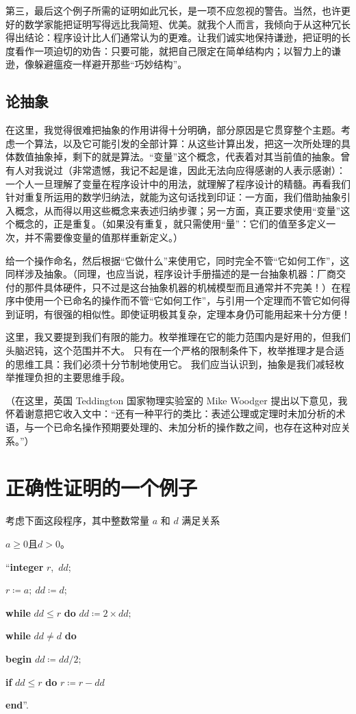 \documentclass[twoside,11pt,fontset=none]{ctexbook}
\begin{document}
第三，最后这个例子所需的证明如此冗长，是一项不应忽视的警告。当然，也许更好的数学家能把证明写得远比我简短、优美。就我个人而言，我倾向于从这种冗长得出结论：程序设计比人们通常认为的更难。让我们诚实地保持谦逊，把证明的长度看作一项迫切的劝告：只要可能，就把自己限定在简单结构内；以智力上的谦逊，像躲避瘟疫一样避开那些“巧妙结构”。

\subsection{论抽象}

在这里，我觉得很难把抽象的作用讲得十分明确，部分原因是它贯穿整个主题。考虑一个算法，以及它可能引发的全部计算：从这些计算出发，把这一次所处理的具体数值抽象掉，剩下的就是算法。“变量”这个概念，代表着对其当前值的抽象。曾有人对我说过（非常遗憾，我记不起是谁，因此无法向应得感谢的人表示感谢）：一个人一旦理解了变量在程序设计中的用法，就理解了程序设计的精髓。再看我们针对重复所运用的数学归纳法，就能为这句话找到印证：一方面，我们借助抽象引入概念，从而得以用这些概念来表述归纳步骤；另一方面，真正要求使用“变量”这个概念的，正是重复。（如果没有重复，就只需使用“量”：它们的值至多定义一次，并不需要像变量的值那样重新定义。）

给一个操作命名，然后根据“它做什么”来使用它，同时完全不管“它如何工作”，这同样涉及抽象。（同理，也应当说，程序设计手册描述的是一台抽象机器：厂商交付的那件具体硬件，只不过是这台抽象机器的机械模型\textemdash{}而且通常并不完美！）在程序中使用一个已命名的操作而不管“它如何工作”，与引用一个定理而不管它如何得到证明，有很强的相似性。即使证明极其复杂，定理本身仍可能用起来十分方便！

这里，我又要提到我们有限的能力。枚举推理在它的能力范围内是好用的，但我们头脑迟钝，这个范围并不大。
只有在一个严格的限制条件下，枚举推理才是合适的思维工具：我们必须十分节制地使用它。
我们应当认识到，抽象是我们减轻枚举推理负担的主要思维手段。

（在这里，英国 Teddington 国家物理实验室的 Mike Woodger 提出以下意见，我怀着谢意把它收入文中：“还有一种平行的类比：表述公理或定理时未加分析的术语，与一个已命名操作预期要处理的、未加分析的操作数之间，也存在这种对应关系。”）

\section[正确性证明的一个例子]{正确性证明的一个例子}

考虑下面这段程序，其中整数常量 $a$ 和 $d$ 满足关系
\medskip

{
	\setlength{\parindent}{8em}
	$a \geqslant 0$\quad 且\quad $d > 0$。
	
	\hspace{-.4em}``\textbf{integer} $r$,\ $dd$;
	
	$r \coloneq a;\ dd \coloneq d$;
	
	\textbf{while} $dd \leqslant r$ \textbf{do} $dd \coloneq 2\times dd;$
	
	\textbf{while} $dd \neq d$ \textbf{do}
	
	\quad \textbf{begin} $dd \coloneq dd/2;$
	
	\quad\quad \textbf{if} $dd \leqslant r$ \textbf{do} $r \coloneq r - dd$
	
	\quad\textbf{end}''.
}
\medskip
\end{document}
